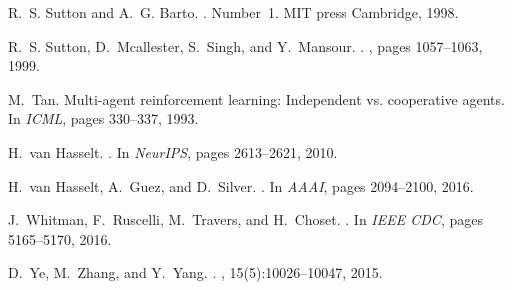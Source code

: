 \documentclass{article}
\begin{document}
\begin{thebibliography}{10}
	R.~S. Sutton and A.~G. Barto.
	.
	\newblock Number~1. MIT press Cambridge, 1998.
	
	R.~S. Sutton, D.~Mcallester, S.~Singh, and Y.~Mansour.
	.
	, pages 1057--1063, 1999.
	
	M.~Tan.
	\newblock Multi-agent reinforcement learning: Independent vs. cooperative
	agents.
	\newblock In {\em ICML}, pages 330--337, 1993.
	
	H.~van Hasselt.
	.
	\newblock In {\em NeurIPS}, pages 2613--2621, 2010.
	
	H.~van Hasselt, A.~Guez, and D.~Silver.
	.
	\newblock In {\em AAAI}, pages 2094--2100, 2016.
	
	J.~Whitman, F.~Ruscelli, M.~Travers, and H.~Choset.
	.
	\newblock In {\em IEEE CDC}, pages 5165--5170, 2016.
	
	D.~Ye, M.~Zhang, and Y.~Yang.
	.
	, 15(5):10026--10047, 2015.
	
\end{thebibliography}
\end{document}

